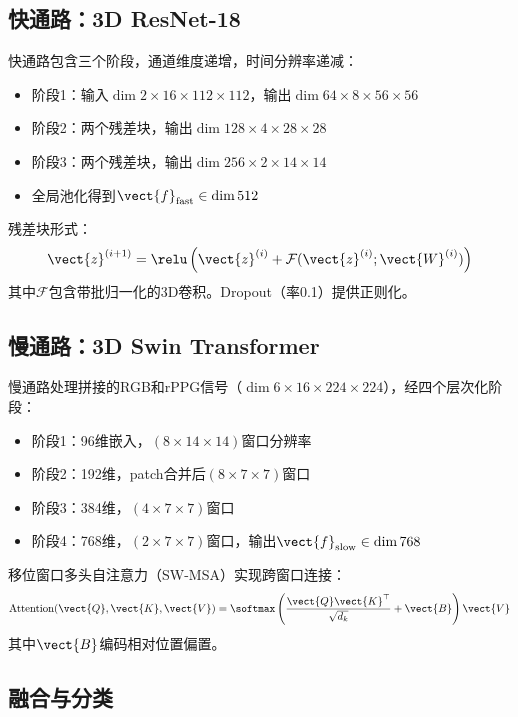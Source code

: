\subsection{快通路：3D ResNet-18}

快通路包含三个阶段，通道维度递增，时间分辨率递减：
\begin{itemize}
\item 阶段1：输入$\dim{2\times 16 \times 112 \times 112}$，输出$\dim{64 \times 8 \times 56 \times 56}$
\item 阶段2：两个残差块，输出$\dim{128 \times 4 \times 28 \times 28}$
\item 阶段3：两个残差块，输出$\dim{256 \times 2 \times 14 \times 14}$
\item 全局池化得到$\vect{f}_{\text{fast}} \in \dim{512}$
\end{itemize}

残差块形式：
\begin{equation}
\vect{z}^{(i+1)} = \relu\left( \vect{z}^{(i)} + \mathcal{F}(\vect{z}^{(i)}; \vect{W}^{(i)}) \right)
\end{equation}
其中$\mathcal{F}$包含带批归一化的3D卷积。Dropout（率0.1）提供正则化。

\subsection{慢通路：3D Swin Transformer}

慢通路处理拼接的RGB和rPPG信号（$\dim{6 \times 16 \times 224 \times 224}$），经四个层次化阶段：
\begin{itemize}
\item 阶段1：96维嵌入，$(8 \times 14 \times 14)$窗口分辨率
\item 阶段2：192维，patch合并后$(8 \times 7 \times 7)$窗口
\item 阶段3：384维，$(4 \times 7 \times 7)$窗口
\item 阶段4：768维，$(2 \times 7 \times 7)$窗口，输出$\vect{f}_{\text{slow}} \in \dim{768}$
\end{itemize}

移位窗口多头自注意力（SW-MSA）实现跨窗口连接：
\begin{equation}
\text{Attention}(\vect{Q}, \vect{K}, \vect{V}) = \softmax\left( \frac{\vect{Q}\vect{K}^\top}{\sqrt{d_k}} + \vect{B} \right) \vect{V}
\end{equation}
其中$\vect{B}$编码相对位置偏置。

\subsection{融合与分类}


